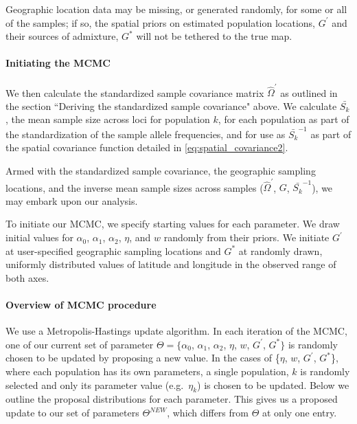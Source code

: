 \documentclass[12pt]{article}
\newcommand{\identifyadmixsource}[1]{{#1^{*}}}
\begin{document}
Geographic location data may be missing, or generated randomly, for some or all of the samples; if so, the spatial priors on estimated population locations, $G^{\prime}$ and their sources of admixture, $\identifyadmixsource{G}$ will not be tethered to the true map. 

\paragraph{Initiating the MCMC}
We then calculate the standardized sample covariance matrix $\widehat{\Omega}^{\prime}$ as outlined in the section ``Deriving the standardized sample covariance" above.  We calculate $\bar{S_k}$, the mean sample size across loci for population $k$, for each population as part of the standardization of the sample allele frequencies, and for use as $\bar{S_k}^{-1}$ as part of the spatial covariance function detailed in \eqref{eq:spatial_covariance2}.

Armed with the standardized sample covariance, the geographic sampling locations, and the inverse mean sample sizes across samples ($\widehat{\Omega}^{\prime}$, $G$, $\bar{S_k}^{-1}$), we may embark upon our analysis.

To initiate our MCMC, we specify starting values for each parameter.  We draw initial values for $\alpha_0$, $\alpha_1$, $\alpha_2$, $\eta$, and $w$ randomly from their priors.  We initiate $G^{\prime}$ at user-specified geographic sampling locations and $\identifyadmixsource{G}$ at randomly drawn, uniformly distributed values of latitude and longitude in the observed range of both axes.  

\paragraph{Overview of MCMC procedure}
We use a Metropolis-Hastings update algorithm. In each iteration of the MCMC, one of our current set of parameter $\Theta= \{\alpha_0$, $\alpha_1$, $\alpha_2$, $\eta$, $w$, $G^{\prime}$, $\identifyadmixsource{G}\}$ is randomly chosen to be updated by proposing a new value.  In the cases of \{$\eta$, $w$, $G^{\prime}$, $\identifyadmixsource{G}$\}, where each population has its own parameters, a single population, $k$ is randomly selected and only its parameter value (e.g.\ $\eta_k$) is chosen to be updated. Below we outline the proposal distributions for each parameter. This gives us a proposed update to our set of parameters $\Theta^{NEW}$, which differs from $\Theta$ at only one entry.
\end{document}
